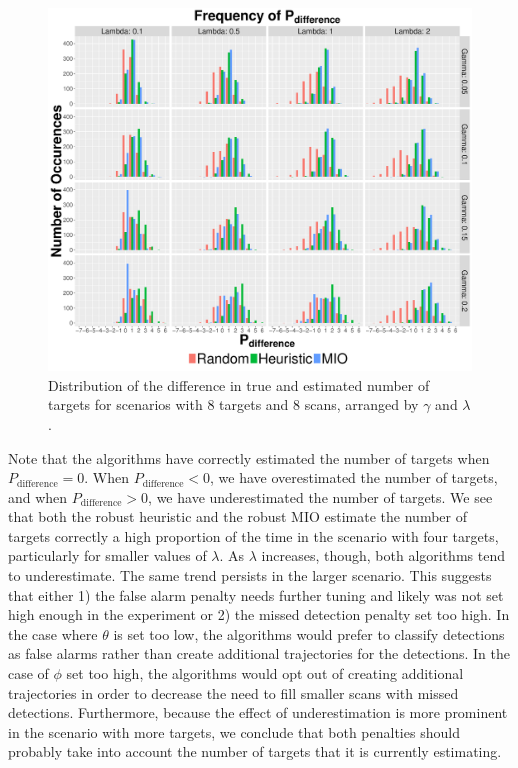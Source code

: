 \begin{figure}[ht]
  \centering
  \includegraphics[width=\columnwidth]{../Figures/8_8_Histogram}
  \caption{Distribution of the difference in true and estimated number of targets for scenarios with 8 targets and 8 scans, arranged by $\gamma$ and $\lambda$.}
  \label{fig:Robust_8_8_Histogram}
\end{figure}

Note that the algorithms have correctly estimated the number of targets when $P_{\text{difference}} = 0$. When $P_{\text{difference}} < 0$, we have overestimated the number of targets, and when $P_{\text{difference}} > 0$, we have underestimated the number of targets. We see that both the robust heuristic and the robust MIO estimate the number of targets correctly a high proportion of the time in the scenario with four targets, particularly for smaller values of $\lambda$. As $\lambda$ increases, though, both algorithms tend to underestimate. The same trend persists in the larger scenario. This suggests that either 1) the false alarm penalty needs further tuning and likely was not set high enough in the experiment or 2) the missed detection penalty set too high. In the case where $\theta$ is set too low, the algorithms would prefer to classify detections as false alarms rather than create additional trajectories for the detections. In the case of $\phi$ set too high, the algorithms would opt out of creating additional trajectories in order to decrease the need to fill smaller scans with missed detections. Furthermore, because the effect of underestimation is more prominent in the scenario with more targets, we conclude that both penalties should probably take into account the number of targets that it is currently estimating.

